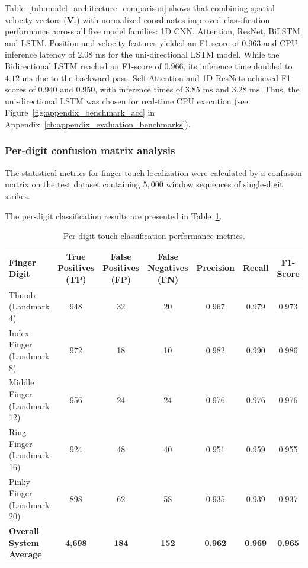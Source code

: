 Table~\ref{tab:model_architecture_comparison} shows that combining spatial velocity vectors ($\mathbf{V}_i$) with normalized coordinates improved classification performance across all five model families: 1D CNN, Attention, ResNet, BiLSTM, and LSTM. Position and velocity features yielded an F1-score of $0.963$ and CPU inference latency of $2.08\text{ ms}$ for the uni-directional LSTM model. While the Bidirectional LSTM reached an F1-score of $0.966$, its inference time doubled to $4.12\text{ ms}$ due to the backward pass. Self-Attention and 1D ResNets achieved F1-scores of $0.940$ and $0.950$, with inference times of $3.85\text{ ms}$ and $3.28\text{ ms}$. Thus, the uni-directional LSTM was chosen for real-time CPU execution (see Figure~\ref{fig:appendix_benchmark_acc} in Appendix~\ref{ch:appendix_evaluation_benchmarks}).

\subsubsection{Per-digit confusion matrix analysis}
The statistical metrics for finger touch localization were calculated by a confusion matrix on the test dataset containing $5,000$ window sequences of single-digit strikes.

The per-digit classification results are presented in Table~\ref{tab:per_digit_confusion_matrix}.

\begin{table}[htbp]
\centering
\caption{Per-digit touch classification performance metrics.}
\label{tab:per_digit_confusion_matrix}
\begin{tabular}{l c c c c c c}
\toprule
\textbf{Finger Digit} & \textbf{True Positives (TP)} & \textbf{False Positives (FP)} & \textbf{False Negatives (FN)} & \textbf{Precision} & \textbf{Recall} & \textbf{F1-Score} \\
\midrule
Thumb (Landmark 4) & 948 & 32 & 20 & 0.967 & 0.979 & 0.973 \\
Index Finger (Landmark 8) & 972 & 18 & 10 & 0.982 & 0.990 & 0.986 \\
Middle Finger (Landmark 12) & 956 & 24 & 24 & 0.976 & 0.976 & 0.976 \\
Ring Finger (Landmark 16) & 924 & 48 & 40 & 0.951 & 0.959 & 0.955 \\
Pinky Finger (Landmark 20) & 898 & 62 & 58 & 0.935 & 0.939 & 0.937 \\
\midrule
\textbf{Overall System Average} & \textbf{4,698} & \textbf{184} & \textbf{152} & \textbf{0.962} & \textbf{0.969} & \textbf{0.965} \\
\bottomrule
\end{tabular}%
\end{table}

